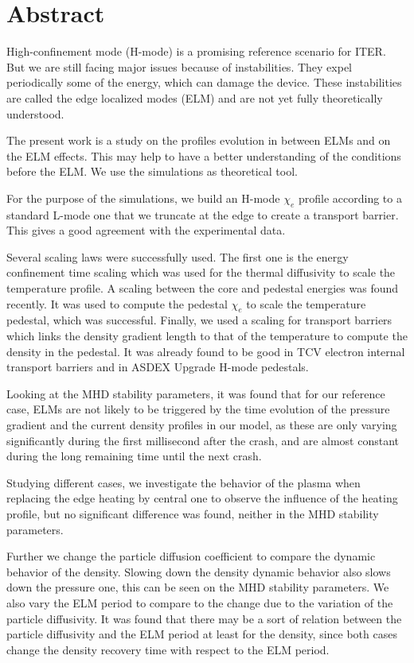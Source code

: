 \chapter*{Abstract}\label{sec:abs}\thispagestyle{fancy}
High-confinement mode (H-mode) is a promising reference scenario for ITER. But we are still facing major issues because of instabilities. They expel periodically some of the energy, which can damage the device. These instabilities are called the edge localized modes (ELM) and are not yet fully theoretically understood.

The present work is a study on the profiles evolution in between ELMs and on the ELM effects. This may help to have a better understanding of the conditions before the ELM. We use the simulations as theoretical tool.

For the purpose of the simulations, we build an H-mode $\chi_e$ profile according to a standard L-mode one that we truncate at the edge to create a transport barrier. This gives a good agreement with the experimental data.

Several scaling laws were successfully used. The first one is the energy confinement time scaling which was used for the thermal diffusivity to scale the temperature profile. A scaling between the core and pedestal energies was found recently. It was used to compute the pedestal $\chi_e$ to scale the temperature pedestal, which was successful. Finally, we used a scaling for transport barriers which links the density gradient length to that of the temperature to compute the density in the pedestal. It was already found to be good in TCV electron internal transport barriers and in ASDEX Upgrade H-mode pedestals.

Looking at the MHD stability parameters, it was found that for our reference case, ELMs are not likely to be triggered by the time evolution of the pressure gradient and the current density profiles in our model, as these are only varying significantly during the first millisecond after the crash, and are almost constant during the long remaining time until the next crash.

Studying different cases, we investigate the behavior of the plasma when replacing the edge heating by central one to observe the influence of the heating profile, but no significant difference was found, neither in the MHD stability parameters.

Further we change the particle diffusion coefficient to compare the dynamic behavior of the density. Slowing down the density dynamic behavior also slows down the pressure one, this can be seen on the MHD stability parameters. We also vary the ELM period to compare to the change due to the variation of the particle diffusivity. It was found that there may be a sort of relation between the particle diffusivity and the ELM period at least for the density, since both cases change the density recovery time with respect to the ELM period.

